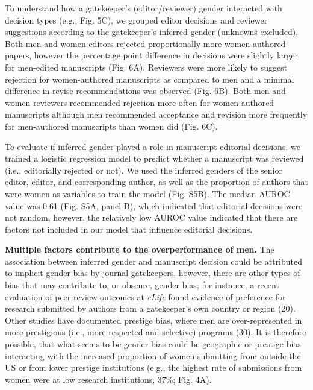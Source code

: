 \documentclass[11pt,]{article}
\begin{document}
To understand how a gatekeeper's (editor/reviewer) gender interacted
with decision types (e.g., Fig. 5C), we grouped editor decisions and
reviewer suggestions according to the gatekeeper's inferred gender
(unknowns excluded). Both men and women editors rejected proportionally
more women-authored papers, however the percentage point difference in
decisions were slightly larger for men-edited manuscripts (Fig. 6A).
Reviewers were more likely to suggest rejection for women-authored
manuscripts as compared to men and a minimal difference in revise
recommendations was observed (Fig. 6B). Both men and women reviewers
recommended rejection more often for women-authored manuscripts although
men recommended acceptance and revision more frequently for men-authored
manuscripts than women did (Fig. 6C).

To evaluate if inferred gender played a role in manuscript editorial
decisions, we trained a logistic regression model to predict whether a
manuscript was reviewed (i.e., editorially rejected or not). We used the
inferred genders of the senior editor, editor, and corresponding author,
as well as the proportion of authors that were women as variables to
train the model (Fig. S5B). The median AUROC value was 0.61 (Fig. S5A,
panel B), which indicated that editorial decisions were not random,
however, the relatively low AUROC value indicated that there are factors
not included in our model that influence editorial decisions.

\textbf{Multiple factors contribute to the overperformance of men.} The
association between inferred gender and manuscript decision could be
attributed to implicit gender bias by journal gatekeepers, however,
there are other types of bias that may contribute to, or obscure, gender
bias; for instance, a recent evaluation of peer-review outcomes at
\emph{eLife} found evidence of preference for research submitted by
authors from a gatekeeper's own country or region (20). Other studies
have documented prestige bias, where men are over-represented in more
prestigious (i.e., more respected and selective) programs (30). It is
therefore possible, that what seems to be gender bias could be
geographic or prestige bias interacting with the increased proportion of
women submitting from outside the US or from lower prestige institutions
(e.g., the highest rate of submissions from women were at low research
institutions, 37\%; Fig. 4A).
\end{document}
